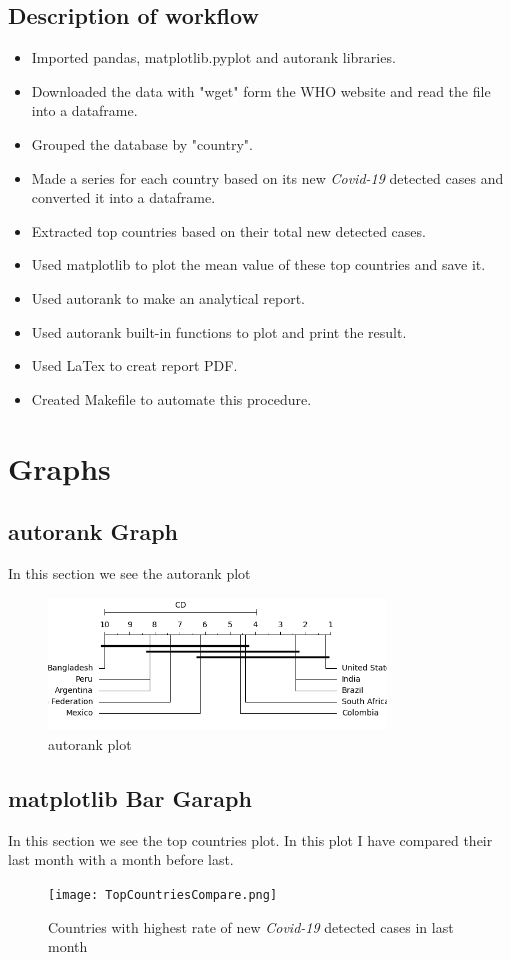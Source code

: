 \documentclass[12pt, letterpaper, twoside]{report}
\begin{document}
\section{Description of workflow}
\begin{itemize}
  \item Imported pandas, matplotlib.pyplot and autorank libraries.
  \item Downloaded the data with "wget" form the WHO website and read the file into a dataframe.
  \item Grouped the database by "country".
  \item Made a series for each country based on its new \textit{Covid-19} detected cases and converted it into a dataframe.
  \item Extracted top countries based on their total new detected cases.
  \item Used matplotlib to plot the mean value of these top countries and save it.
  \item Used autorank to make an analytical report.
  \item Used autorank built-in functions to plot and print the result.
  \item Used LaTex to creat report PDF.
  \item Created Makefile to automate this procedure.
\end{itemize}

\chapter{Graphs}
\section{autorank Graph}
In this section we see the autorank plot
\begin{figure}[ht]
    \centering
    \includegraphics[width=0.8\textwidth]{autorank.png}
    \caption{autorank plot}
    \label{fig:autorank}
\end{figure} 

\section{matplotlib Bar Garaph}
 In this section we see the top countries plot. 
 In this plot I have compared their last month with a month before last.
\begin{figure}[ht]
    \centering
    \texttt{[image: TopCountriesCompare.png]}
    \caption{Countries with highest rate of new \textit{Covid-19} detected cases in last month}
    \label{fig:TopCountriesCompare}
\end{figure}
\end{document}
